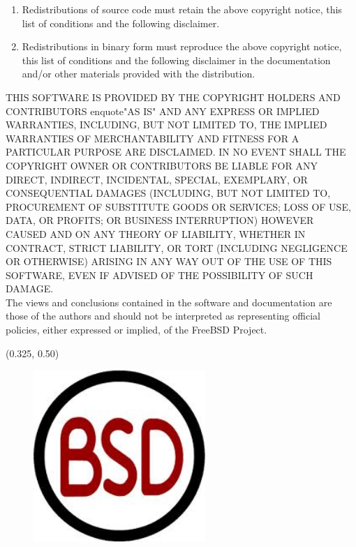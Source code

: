 \documentclass[article]{report}         %
\begin{document}
          \begin{enumerate}
          \item Redistributions of source code must retain the above copyright notice, this list of conditions and the following disclaimer.
          \item Redistributions in binary form must reproduce the above copyright notice, this list of conditions and the following disclaimer in the documentation and/or other materials provided with the distribution.
          \end{enumerate}

          THIS SOFTWARE IS PROVIDED BY THE COPYRIGHT HOLDERS AND CONTRIBUTORS enquote{"AS IS"} AND
          ANY EXPRESS OR IMPLIED WARRANTIES, INCLUDING, BUT NOT LIMITED TO, THE IMPLIED
          WARRANTIES OF MERCHANTABILITY AND FITNESS FOR A PARTICULAR PURPOSE ARE
          DISCLAIMED. IN NO EVENT SHALL THE COPYRIGHT OWNER OR CONTRIBUTORS BE LIABLE FOR
          ANY DIRECT, INDIRECT, INCIDENTAL, SPECIAL, EXEMPLARY, OR CONSEQUENTIAL DAMAGES
          (INCLUDING, BUT NOT LIMITED TO, PROCUREMENT OF SUBSTITUTE GOODS OR SERVICES;
          LOSS OF USE, DATA, OR PROFITS; OR BUSINESS INTERRUPTION) HOWEVER CAUSED AND
          ON ANY THEORY OF LIABILITY, WHETHER IN CONTRACT, STRICT LIABILITY, OR TORT
          (INCLUDING NEGLIGENCE OR OTHERWISE) ARISING IN ANY WAY OUT OF THE USE OF THIS
          SOFTWARE, EVEN IF ADVISED OF THE POSSIBILITY OF SUCH DAMAGE.\\

          The views and conclusions contained in the software and documentation are those
          of the authors and should not be interpreted as representing official policies, 
          either expressed or implied, of the FreeBSD Project.\\

        \begin{textblock}{0.628}(0.325, 0.50)
          \begin{figure}
            \includegraphics[width=6.5cm]{images/BSD.jpeg}
          \end{figure}
        \end{textblock}
\end{document}
